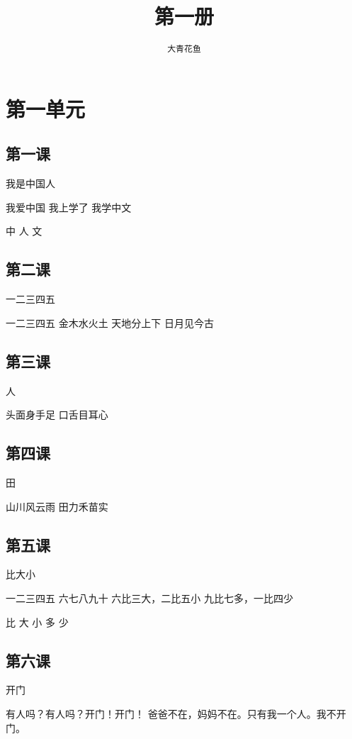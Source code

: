 \documentclass[12pt,UTF8]{ctexbook}
\title{\zihao{0} \bfseries 第一册}
\author{\zihao{2} \texttt{大青花鱼}}
\date{}
\begin{document}
\maketitle
\tableofcontents
\newpage

\chapter{第一单元}

\section{第一课}

我是中国人

我爱中国
我上学了
我学中文

中 人 文

\section{第二课}

一二三四五

一二三四五
金木水火土
天地分上下
日月见今古

\section{第三课}

人

头面身手足
口舌目耳心

\section{第四课}

田

山川风云雨
田力禾苗实

\section{第五课}

比大小

一二三四五
六七八九十
六比三大，二比五小
九比七多，一比四少

比 大 小 多 少

\section{第六课}

开门

有人吗？有人吗？开门！开门！
爸爸不在，妈妈不在。只有我一个人。我不开门。
\end{document}

